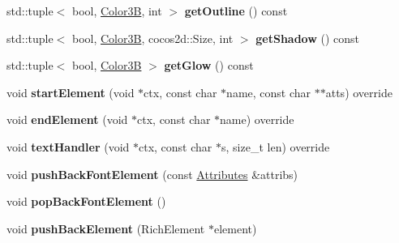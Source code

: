 \begin{DoxyCompactItemize}
std\+::tuple$<$ bool, \hyperlink{structColor3B}{Color3B}, int $>$ {\bfseries get\+Outline} () const
\item 
\mbox{\label{classMyXMLVisitor_a043097d28765aa05421969d50d54a851}} 
std\+::tuple$<$ bool, \hyperlink{structColor3B}{Color3B}, cocos2d\+::\+Size, int $>$ {\bfseries get\+Shadow} () const
\item 
\mbox{\label{classMyXMLVisitor_adfc27cbb48d650bd7223ca84a9194f93}} 
std\+::tuple$<$ bool, \hyperlink{structColor3B}{Color3B} $>$ {\bfseries get\+Glow} () const
\item 
\mbox{\label{classMyXMLVisitor_aa8492d8607c8bc25569d88d009f8f3d3}} 
void {\bfseries start\+Element} (void $\ast$ctx, const char $\ast$name, const char $\ast$$\ast$atts) override
\item 
\mbox{\label{classMyXMLVisitor_a6c39e5fb58b9f8c18d1481e7dff9de03}} 
void {\bfseries end\+Element} (void $\ast$ctx, const char $\ast$name) override
\item 
\mbox{\label{classMyXMLVisitor_aa43cd9cb6dbab1ff783667f7317bc7e3}} 
void {\bfseries text\+Handler} (void $\ast$ctx, const char $\ast$s, size\+\_\+t len) override
\item 
\mbox{\label{classMyXMLVisitor_ab94c7279ab48928d8356c9c77be5491e}} 
void {\bfseries push\+Back\+Font\+Element} (const \hyperlink{structMyXMLVisitor_1_1Attributes}{Attributes} \&attribs)
\item 
\mbox{\label{classMyXMLVisitor_a4c46162b27702c4e45af8fc959c34c79}} 
void {\bfseries pop\+Back\+Font\+Element} ()
\item 
\mbox{\label{classMyXMLVisitor_aa87da874608c0b2ebff352521e7f5d91}} 
void {\bfseries push\+Back\+Element} (Rich\+Element $\ast$element)
\end{DoxyCompactItemize}

